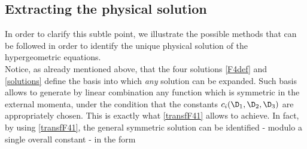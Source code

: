 \documentclass[a4paper,11pt,openright,twoside]{book}
\numberwithin{equation}{section}
\begin{document}
\subsection{Extracting the physical solution}
In order to clarify this subtle point, we illustrate the possible methods that can be followed in order to identify the unique physical solution of the hypergeometric equations. \\
Notice, as already mentioned above, that the four solutions \eqref{F4def} and \eqref{solutions} define the 
basis into which {\em any} solution can be expanded. Such basis allows to generate 
by linear combination any function which is symmetric in the external momenta, under the condition that the constants 
$c_i(\D_1,\D_2,\D_3)$ are appropriately chosen. This is exactly what \eqref{transfF41} allows to achieve. In fact, by using \eqref{transfF41}, the general symmetric solution can be identified - modulo a single overall constant - in the form 
\end{document}
